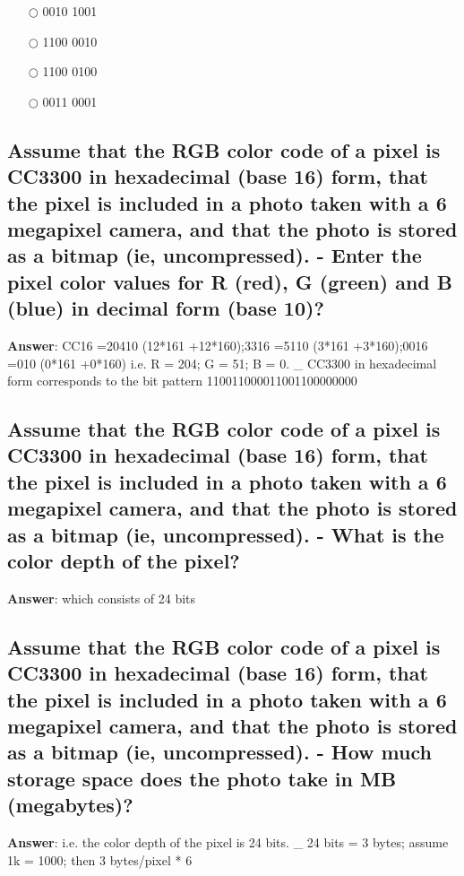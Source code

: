 \documentclass[a4paper,11pt,oneside]{article}
\begin{document}
\begin{sloppypar}
\label{q:3530001:mc:en:True}

\begin{itemize}
  \item[$\bigcirc$] 0010 1001
  \item[$\bigcirc$] 1100 0010
  \item[$\bigcirc$] 1100 0100
  \item[$\bigcirc$] 0011 0001
\end{itemize}



\subsection{Assume that the RGB color code of a pixel is CC3300 in hexadecimal (base 16) form, that the pixel is included in a photo taken with a 6 megapixel camera, and that the photo is stored as a bitmap (ie, uncompressed). - Enter the pixel color values for R (red), G (green) and B (blue) in decimal form (base 10)?}

\label{q:35400:sa:en:True}

\textbf{Answer}: CC16 =20410 (12*161 +12*160);3316 =5110 (3*161 +3*160);0016 =010 (0*161 +0*160) i.e. R = 204; G = 51; B = 0. _ CC3300 in hexadecimal form corresponds to the bit pattern 110011000011001100000000

\subsection{Assume that the RGB color code of a pixel is CC3300 in hexadecimal (base 16) form, that the pixel is included in a photo taken with a 6 megapixel camera, and that the photo is stored as a bitmap (ie, uncompressed). - What is the color depth of the pixel?}

\label{q:3540001:sa:en:True}

\textbf{Answer}:  which consists of 24 bits

\subsection{Assume that the RGB color code of a pixel is CC3300 in hexadecimal (base 16) form, that the pixel is included in a photo taken with a 6 megapixel camera, and that the photo is stored as a bitmap (ie, uncompressed). - How much storage space does the photo take in MB (megabytes)?}

\label{q:354000102:sa:en:True}

\textbf{Answer}:  i.e. the color depth of the pixel is 24 bits. _ 24 bits = 3 bytes; assume 1k = 1000; then 3 bytes/pixel * 6




\end{sloppypar}
\end{document}
